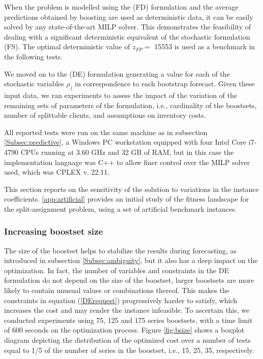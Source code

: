 \documentclass[review,a4paper,fleqn,3p,11pt,authoryear]{elsarticle}
\begin{document}
When the problem is modelled using the (FD) formulation and the average predictions obtained by boosting are used as deterministic data, it can be easily solved by any state-of-the-art MILP solver. This demonstrates the feasibility of dealing with a significant deterministic equivalent of the stochastic formulation (FS). The optimal deterministic value of $z_{FP} =$ 15553 is used as a benchmark in the following tests.

We moved on to the (DE) formulation generating a value for each of the stochastic variables $\rho_j$ in correspondence to each bootstrap forecast.
Given these input data, we ran experiments to assess the impact of the variation of the remaining sets of parameters of the formulation, i.e., cardinality of the boostsets, number of splittable clients, and assumptions on inventory costs. 

All reported tests were run on the same machine as in subsection \ref{Subsec:predictive}, a Windows PC workstation equipped with four Intel Core i7-4790 CPUs running at 3.60 GHz and 32 GB of RAM, but in this case the implementation language was C++ to allow finer control over the MILP solver used, which was CPLEX v. 22.11.

This section reports on the sensitivity of the solution to variations in the instance coefficients. \ref{app:artificial} provides an initial study of the fitness landscape for the split-assignment problem, using a set of artificial benchmark instances.

\subsubsection*{Increasing boostset size}

The size of the boostset helps to stabilize the results during forecasting, as introduced in subsection \ref{Subsec:ambiguity}, but it also has a deep impact on the optimization. In fact, the number of variables and constraints in the DE formulation do not depend on the size of the boostset, larger boostsets are more likely to contain unusual values or combinations thereof. This makes the constraints in equation (\ref{DErequest}) progressively harder to satisfy, which increases the cost and may render the instance infeasible.
To ascertain this, we conducted experiments using 75, 125 and 175 series boostsets, with a time limit of 600 seconds on the optimization process. Figure \ref{fig:bsize} shows a boxplot diagram depicting the distribution of the optimized cost over a number of tests equal to 1/5 of the number of series in the boostset, i.e., 15, 25, 35, respectively.
\end{document}
